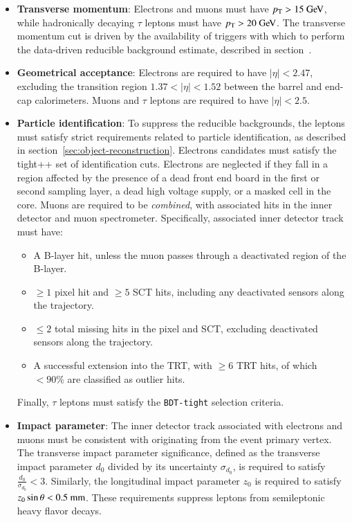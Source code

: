 \begin{itemize}

	\item \textbf{Transverse momentum}: Electrons and muons must have $\pt>15 \GeV$, while hadronically decaying $\tau$ leptons must have $\pt>20 \GeV$. The transverse momentum cut is driven by the availability of triggers with which to perform the data-driven reducible background estimate, described in section~\label{sec:fake-factors}. 

	\item \textbf{Geometrical acceptance}: Electrons are required to have $|\eta|<2.47$, excluding the transition region $1.37<|\eta|<1.52$ between the barrel and end-cap calorimeters. Muons and $\tau$ leptons are required to have $|\eta|<2.5$.

	\item \textbf{Particle identification}: To suppress the reducible backgrounds, the leptons must satisfy strict requirements related to particle identification, as described in section~\ref{sec:object-reconstruction}. Electrons candidates must satisfy the tight++ set of identification cuts. Electrons are neglected if they fall in a region affected by the presence of a dead front end board in the first or second sampling layer, a dead high voltage supply, or a masked cell in the core. Muons are required to be \emph{combined}, with associated hits in the inner detector and muon spectrometer. Specifically, associated inner detector track must have:
	\begin{itemize}
	  \item A B-layer hit, unless the muon passes through a deactivated region of the B-layer.
	  \item $\geq1$ pixel hit and $\geq5$ SCT hits, including any deactivated sensors along the trajectory.
	  \item $\leq2$ total missing hits in the pixel and SCT, excluding deactivated sensors along the trajectory. 
	  \item A successful extension into the TRT, with $\geq6$ TRT hits, of which $<90\%$ are classified as outlier hits.
	\end{itemize}

	Finally, $\tau$ leptons must satisfy the \texttt{BDT-tight} selection criteria.

	\item \textbf{Impact parameter}: The inner detector track associated with electrons and muons must be consistent with originating from the event primary vertex. The transverse impact parameter significance, defined as the transverse impact parameter $d_0$ divided by its uncertainty $\sigma_{d_0}$, is required to satisfy $\frac{d_0}{\sigma_{d_0}}<3$. Similarly, the longitudinal impact parameter $z_0$ is required to satisfy $z_0\sin\theta < 0.5~\mathrm{mm}$. These requirements suppress leptons from semileptonic heavy flavor decays. 


\end{itemize}

